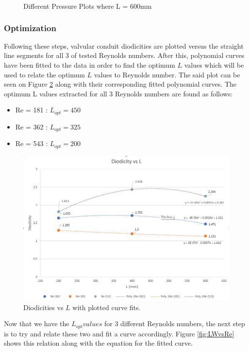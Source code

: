 \begin{figure}[H]
\caption{Different Pressure Plots where L = 600mm}
\label{fig:l600}
\end{figure}

\subsubsection{Optimization}

Following these steps, valvular conduit diodicities are plotted versus the straight line segments for all 3 of tested Reynolds numbers. After this, polynomial curves have been fitted to the data in order to find the optimum $L$ values which will be used to relate the optimum $L$ values to Reynolds number. The said plot can be seen on Figure \ref{fig:diodi_vs_L} along with their corresponding fitted polynomial curves. The optimum L values extracted for all 3 Reynolds numbers are found as follows:
\begin{itemize}
    \item Re = 181 : $L_{opt} = 450$
    \item Re = 362 : $L_{opt} = 325$
    \item Re = 543 : $L_{opt} = 200$
\end{itemize}

\begin{figure}[H]
    \centering
    \includegraphics[width = .96\textwidth]{images/task2/diodicity_vs_L_fits.png}
    \caption{Diodicities vs $L$ with plotted curve fits.}
    \label{fig:diodi_vs_L}
\end{figure}


Now that we have the $L_{opt} values$ for 3 different Reynolds numbers, the next step is to try and relate these two and fit a curve accordingly. Figure \ref{fig:LWvsRe} shows this relation along with the equation for the fitted curve. 


